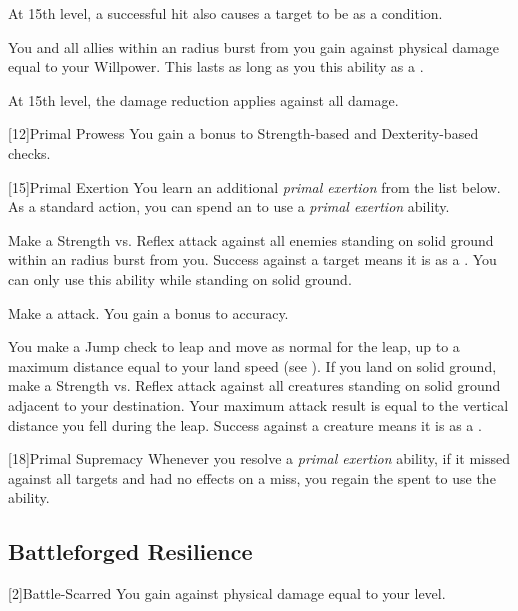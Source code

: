 {            \par At 15th level, a successful hit also causes a target to be \deafened as a condition.

             You and all allies within an \arealarge radius burst from you gain  against physical damage equal to your Willpower.
            This lasts as long as you  this ability as a .

            \par At 15th level, the damage reduction applies against all damage.
        }

        [12]{Primal Prowess}
        You gain a  bonus to Strength-based and Dexterity-based checks.

        [15]{Primal Exertion}
        You learn an additional \textit{primal exertion} from the list below.
        As a standard action, you can spend an  to use a \textit{primal exertion} ability.
        {
             Make a Strength vs. Reflex attack against all enemies standing on solid ground within an \areamed radius burst from you.
            Success against a target means it is \stunned as a .
            You can only use this ability while standing on solid ground.

             Make a  attack.
            You gain a  bonus to accuracy.

             You make a Jump check to leap and move as normal for the leap, up to a maximum distance equal to your land speed (see ).
            If you land on solid ground, make a Strength vs. Reflex attack against all creatures standing on solid ground adjacent to your destination.
            Your maximum attack result is equal to the vertical distance you fell during the leap.
            Success against a creature means it is \stunned as a .
        }

        [18]{Primal Supremacy}
        Whenever you resolve a \textit{primal exertion} ability, if it missed against all targets and had no effects on a miss, you regain the  spent to use the ability.

    \subsection{Battleforged Resilience}
        [2]{Battle-Scarred} You gain  against physical damage equal to your level.

